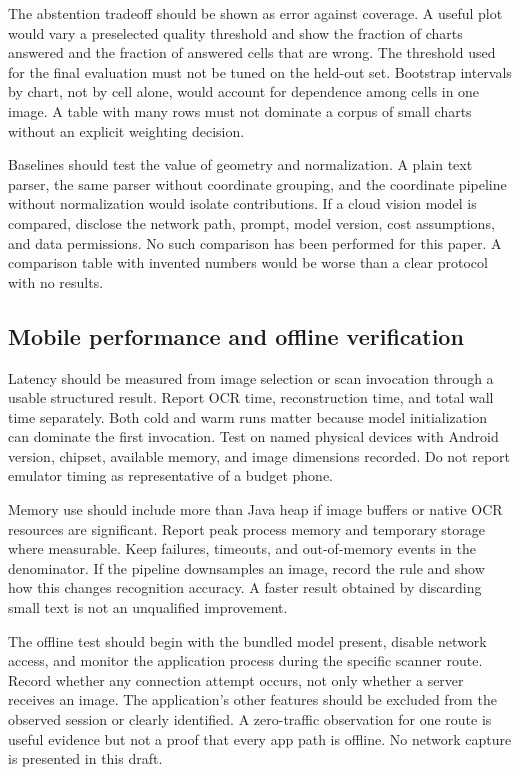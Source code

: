 \documentclass[10pt,letterpaper]{article}
\begin{document}
The abstention tradeoff should be shown as error against coverage. A useful plot would vary a preselected quality threshold and show the fraction of charts answered and the fraction of answered cells that are wrong. The threshold used for the final evaluation must not be tuned on the held-out set. Bootstrap intervals by chart, not by cell alone, would account for dependence among cells in one image. A table with many rows must not dominate a corpus of small charts without an explicit weighting decision.

Baselines should test the value of geometry and normalization. A plain text parser, the same parser without coordinate grouping, and the coordinate pipeline without normalization would isolate contributions. If a cloud vision model is compared, disclose the network path, prompt, model version, cost assumptions, and data permissions. No such comparison has been performed for this paper. A comparison table with invented numbers would be worse than a clear protocol with no results.

\subsection{Mobile performance and offline verification}

Latency should be measured from image selection or scan invocation through a usable structured result. Report OCR time, reconstruction time, and total wall time separately. Both cold and warm runs matter because model initialization can dominate the first invocation. Test on named physical devices with Android version, chipset, available memory, and image dimensions recorded. Do not report emulator timing as representative of a budget phone.

Memory use should include more than Java heap if image buffers or native OCR resources are significant. Report peak process memory and temporary storage where measurable. Keep failures, timeouts, and out-of-memory events in the denominator. If the pipeline downsamples an image, record the rule and show how this changes recognition accuracy. A faster result obtained by discarding small text is not an unqualified improvement.

The offline test should begin with the bundled model present, disable network access, and monitor the application process during the specific scanner route. Record whether any connection attempt occurs, not only whether a server receives an image. The application's other features should be excluded from the observed session or clearly identified. A zero-traffic observation for one route is useful evidence but not a proof that every app path is offline. No network capture is presented in this draft.
\end{document}
